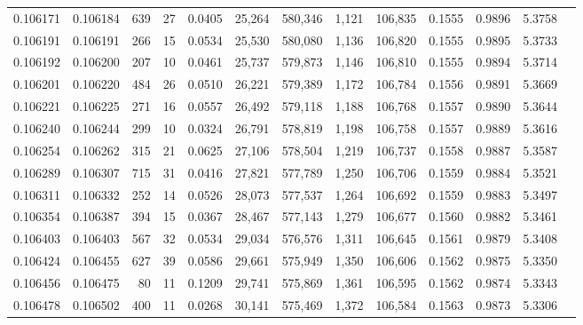 \begin{tabular}{rrrrrrrrrrrrr}
0.106171 & 0.106184 &   639 &  27 &                                     0.0405 &  25,264 & 580,346 &   1,121 & 106,835 & 0.1555 & 0.9896 & 5.3758 \\
0.106191 & 0.106191 &   266 &  15 &                                     0.0534 &  25,530 & 580,080 &   1,136 & 106,820 & 0.1555 & 0.9895 & 5.3733 \\
0.106192 & 0.106200 &   207 &  10 &                                     0.0461 &  25,737 & 579,873 &   1,146 & 106,810 & 0.1555 & 0.9894 & 5.3714 \\
0.106201 & 0.106220 &   484 &  26 &                                     0.0510 &  26,221 & 579,389 &   1,172 & 106,784 & 0.1556 & 0.9891 & 5.3669 \\
0.106221 & 0.106225 &   271 &  16 &                                     0.0557 &  26,492 & 579,118 &   1,188 & 106,768 & 0.1557 & 0.9890 & 5.3644 \\
0.106240 & 0.106244 &   299 &  10 &                                     0.0324 &  26,791 & 578,819 &   1,198 & 106,758 & 0.1557 & 0.9889 & 5.3616 \\
0.106254 & 0.106262 &   315 &  21 &                                     0.0625 &  27,106 & 578,504 &   1,219 & 106,737 & 0.1558 & 0.9887 & 5.3587 \\
0.106289 & 0.106307 &   715 &  31 &                                     0.0416 &  27,821 & 577,789 &   1,250 & 106,706 & 0.1559 & 0.9884 & 5.3521 \\
0.106311 & 0.106332 &   252 &  14 &                                     0.0526 &  28,073 & 577,537 &   1,264 & 106,692 & 0.1559 & 0.9883 & 5.3497 \\
0.106354 & 0.106387 &   394 &  15 &                                     0.0367 &  28,467 & 577,143 &   1,279 & 106,677 & 0.1560 & 0.9882 & 5.3461 \\
0.106403 & 0.106403 &   567 &  32 &                                     0.0534 &  29,034 & 576,576 &   1,311 & 106,645 & 0.1561 & 0.9879 & 5.3408 \\
0.106424 & 0.106455 &   627 &  39 &                                     0.0586 &  29,661 & 575,949 &   1,350 & 106,606 & 0.1562 & 0.9875 & 5.3350 \\
0.106456 & 0.106475 &    80 &  11 &                                     0.1209 &  29,741 & 575,869 &   1,361 & 106,595 & 0.1562 & 0.9874 & 5.3343 \\
0.106478 & 0.106502 &   400 &  11 &                                     0.0268 &  30,141 & 575,469 &   1,372 & 106,584 & 0.1563 & 0.9873 & 5.3306 \\

\end{tabular}
